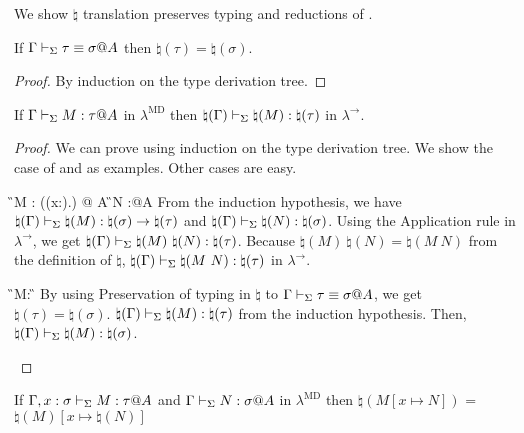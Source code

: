 We show \( \natural \) translation preserves typing and reductions of \LMD.


\begin{lemma}
    If $\Gamma \vdash_\Sigma \tau \equiv \sigma @ A$ then $\natural(\tau) = \natural(\sigma)$.
\end{lemma}

\begin{proof}
    By induction on the type derivation tree.
\end{proof}

\begin{lemma}
    \label{lemma:PreservationOfTypingInNatural}
    If $\G \V M:\tau@A$ in $\lambda^{\text{MD}}$ then $\natural(\Gamma) \vdash_\Sigma \natural(M): \natural(\tau)$ in $\lambda^\to$.
\end{lemma}

\begin{proof}
    We can prove using induction on the type derivation tree.
    We show the case of \TApp{} and \TConv{} as examples.
    Other cases are easy.
    \begin{rneqncase}{\TApp{}}{
            \G \V M : (\Pi(x:\sigma).\tau) @ A  \G \V N :\sigma @A
        }
        From the induction hypothesis, we have $\natural(\Gamma) \vdash_\Sigma \natural(M) : \natural(\sigma) \to \natural(\tau)$ and $\natural(\Gamma) \vdash_\Sigma \natural(N) : \natural(\sigma)$.
        Using the Application rule in $\lambda^\to$, we get $\natural(\G) \V \natural(M)\ \natural(N) : \natural(\tau)$.
        Because $\natural(M)\ \natural(N) = \natural(M\ N)$ from the definition of $\natural$, $\natural(\Gamma) \vdash_\Sigma \natural(M\ N) : \natural(\tau)$ in $\lambda^\to$.
    \end{rneqncase}
    \begin{rneqncase}{\TConv{}}{
            \G\V M:\tau@A {} \G\V \tau\E\sigma@A
        }
        By using Preservation of typing in $\natural$ to $\G\V \tau\E\sigma@A$, we get $\natural(\tau) = \natural(\sigma)$.
        $\natural(\Gamma) \vdash_\Sigma \natural(M):\natural(\tau)$ from the induction hypothesis.
        Then, $\natural(\Gamma) \vdash_\Sigma \natural(M):\natural(\sigma)$.
    \end{rneqncase}
\end{proof}

\begin{lemma}
    If $\G, x:\sigma \V M:\tau@A$ and $\G \V N:\sigma@A$ in $\lambda^{\text{MD}}$
    then $\natural(M[x \mapsto N])$ = $\natural(M)[x\mapsto\natural(N)]$
\end{lemma}

